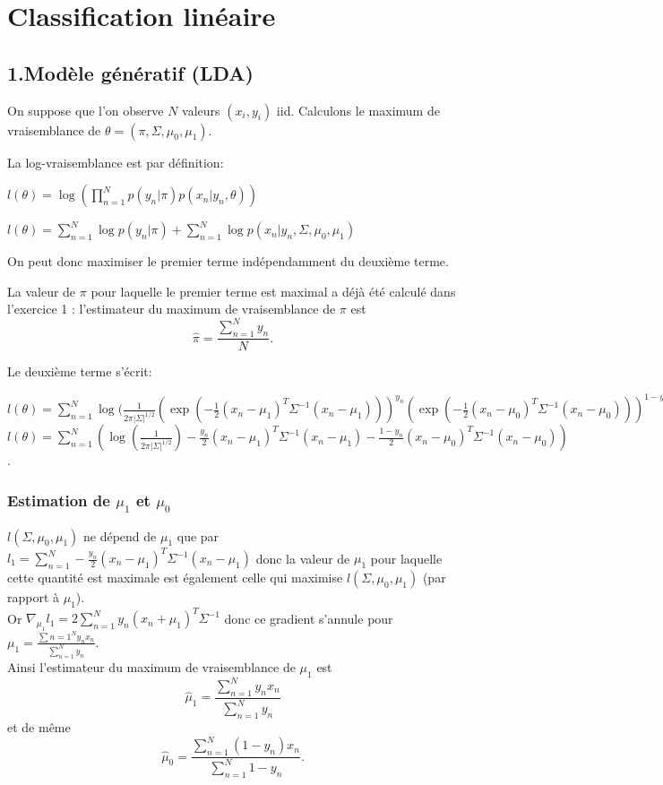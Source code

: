 \documentclass{article}
\begin{document}
\section{Classification linéaire}
\subsection{1.Modèle génératif (LDA)}

On suppose que l'on observe $N$ valeurs $(x_i, y_i)$ iid. Calculons le maximum de vraisemblance de $\theta=(\pi, \Sigma, \mu_0, \mu_1)$.

La log-vraisemblance est par définition:

$l(\theta) = \log(\prod_{n=1}^N p (y_n | \pi)  p(x_{ n}|y_n, \theta))$

$l(\theta) = \sum_{n=1}^N \log p(y_n |\pi) + \sum_{n=1}^{N} \log p(x_{ n}|y_n,  \Sigma, \mu_0, \mu_1)$

On peut donc maximiser le premier terme indépendamment du deuxième terme.

La valeur de $\pi$ pour laquelle le premier terme est maximal a déjà été calculé dans l'exercice 1 : l'estimateur du maximum de vraisemblance de $\pi$ est $$\hat{\pi} = \frac{\sum_{n=1}^{N} y_{n}}{N}.$$

Le deuxième terme s'écrit:

$l(\theta) = \sum_{n=1}^{N} \log(\frac{1}{2\pi|\Sigma|^{1/2}} (\exp(-\frac{1}{2}(x_{n}-\mu_{1})^{T}\Sigma^{-1}(x_{n}-\mu_{1})))^{y_{n}}(\exp(-\frac{1}{2}(x_{n}-\mu_{0})^{T}\Sigma^{-1}(x_{n}-\mu_{0})))^{1-y_{n}}$ \\
$l(\theta) = \sum_{n=1}^{N} (\log(\frac{1}{2\pi|\Sigma|^{1/2}})-\frac{y_{n}}{2}(x_{n}-\mu_{1})^{T}\Sigma^{-1}(x_{n}-\mu_{1})-\frac{1-y_{n}}{2}(x_{n}-\mu_{0})^{T}\Sigma^{-1}(x_{n}-\mu_{0}))$.

\subsubsection{Estimation de $\mu_1$ et $\mu_0$}
$l( \Sigma, \mu_0, \mu_1) $ ne dépend de $ \mu_1$ que par $l_{1}=\sum_{n=1}^{N}-\frac{y_{n}}{2}(x_{n}-\mu_{1})^{T}\Sigma^{-1}(x_{n}-\mu_{1})$ donc la valeur de $ \mu_1$ pour laquelle cette quantité est maximale est également celle qui maximise $l( \Sigma, \mu_0, \mu_1) $ (par rapport à $\mu_1$).\\
Or $\nabla_{\mu_{1}}l_{1}=2\sum_{n=1}^{N}y_{n}(x_{n}+\mu_{1})^{T}\Sigma^{-1}$ donc ce gradient s'annule pour $\mu_{1}=\frac{\sum{n=1}^{N}y_{n}x_{n}}{\sum_{n=1}^{N}y_{n}}$.\\
Ainsi l'estimateur du maximum de vraisemblance de $\mu_{1}$ est $$\hat{\mu}_{1}=\frac{\sum_{n=1}^{N}y_{n}x_{n}}{\sum_{n=1}^{N}y_{n}}$$
et de même $$\hat{\mu}_{0}=\frac{\sum_{n=1}^{N}(1-y_{n})x_{n}}{\sum_{n=1}^{N}1-y_{n}}.$$
\end{document}
